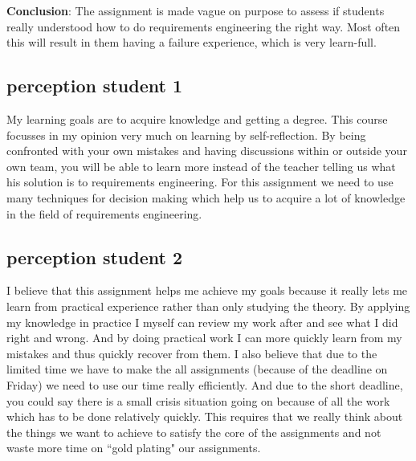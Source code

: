 \textbf{Conclusion}: The assignment is made vague on purpose to assess if students really understood how to do requirements engineering the right way. Most often this will result in them having a failure experience,
which is very learn-full. 

\subsection{perception student 1}
My learning goals are to acquire knowledge and getting a degree. This course focusses in my opinion
very much on learning by self-reflection. By being confronted with your own mistakes and having
discussions within or outside your own team, you will be able to learn more instead of the teacher
telling us what his solution is to requirements engineering. For this assignment we need to use many
techniques for decision making which help us to acquire a lot of knowledge in the field of
requirements engineering.


\subsection{perception student 2}
I believe that this assignment helps me achieve my goals because it really lets me learn from practical
experience rather than only studying the theory. By applying my knowledge in practice I myself can
review my work after and see what I did right and wrong. And by doing practical work I can more
quickly learn from my mistakes and thus quickly recover from them. I also believe that due to the
limited time we have to make the all assignments (because of the deadline on Friday) we need to use
our time really efficiently. And due to the short deadline, you could say there is a small crisis situation
going on because of all the work which has to be done relatively quickly. This requires that we really
think about the things we want to achieve to satisfy the core of the assignments and not waste more
time on “gold plating" our assignments.

